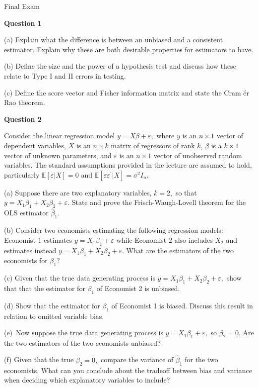 \documentclass{article}
\begin{document}
\begin{center}
{\Large Final Exam}
\end{center}

\textbf{Question 1}

(a) Explain what the difference is between an unbiased and a consistent
estimator. Explain why these are both desirable properties for estimators to
have.

(b) Define the size and the power of a hypothesis test and discuss how these
relate to Type I and II errors in testing.

(c) Define the score vector and Fisher information matrix and state the Cram%
\'{e}r Rao theorem.

\bigskip

\textbf{Question 2}

Consider the linear regression model $y=X\beta +\varepsilon ,$ where $y$ is
an $n\times 1$ vector of dependent variables, $X$ is an $n\times k$ matrix
of regressors of rank $k$, $\beta $ is a $k\times 1$ vector of unknown
parameters, and $\varepsilon $ is an $n\times 1$ vector of unobserved random
variables. The standard assumptions provided in the lecture are assumed to
hold, particularly $\mathbb{E}\left[ \varepsilon |X\right] =0$ and $\mathbb{E%
}\left[ \varepsilon \varepsilon ^{\prime }|X\right] =\sigma ^{2}I_{n}.$

(a) Suppose there are two explanatory variables, $k=2,$ so that $%
y=X_{1}\beta _{1}+X_{2}\beta _{2}+\varepsilon .$ State and prove the
Frisch-Waugh-Lovell theorem for the OLS estimator $\hat{\beta}_{1}.$

(b) Consider two economists estimating the following regression models:
Economist 1 estimates $y=X_{1}\beta _{1}+\varepsilon $ while Economist 2
also includes $X_{2}$ and estimates instead $y=X_{1}\beta _{1}+X_{2}\beta
_{2}+\varepsilon .$ What are the estimators of the two economists for $\beta
_{1}$?

(c) Given that the true data generating process is $y=X_{1}\beta
_{1}+X_{2}\beta _{2}+\varepsilon ,$ show that that the estimator for $\beta
_{1}$ of Economist 2 is unbiased.

(d) Show that the estimator for $\beta _{1}$ of Economist 1 is biased.
Discuss this result in relation to omitted variable bias.

(e)\ Now suppose the true data generating process is $y=X_{1}\beta
_{1}+\varepsilon ,$ so $\beta _{2}=0.$ Are the two estimators of the two
economists unbiased?

(f) Given that the true $\beta _{2}=0,$ compare the variance of $\hat{\beta}%
_{1}$ for the two economists. What can you conclude about the tradeoff
between bias and variance when deciding which explanatory variables to
include?
\end{document}
